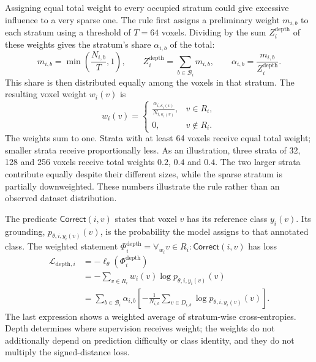 \documentclass[12pt,a4paper]{article}
\begin{document}
Assigning equal total weight to every occupied stratum could give
excessive influence to a very sparse one. The rule first assigns a
preliminary weight $m_{i,b}$ to each stratum using a threshold of $T=64$
voxels. Dividing by the sum $Z_i^{\mathrm{depth}}$ of these weights gives
the stratum's share $\alpha_{i,b}$ of the total:
\begin{equation}
 m_{i,b}=\min\left(\frac{N_{i,b}}{T},1\right),
\qquad
 Z_i^{\mathrm{depth}}=\sum_{b\in\mathcal{B}_i}m_{i,b},
\qquad
 \alpha_{i,b}=\frac{m_{i,b}}{Z_i^{\mathrm{depth}}}.
\label{eq:depth-stratum-masses}
\end{equation}
This share is then distributed equally among the voxels in that stratum.
The resulting voxel weight $w_i(v)$ is
\begin{equation}
 w_i(v)=
 \begin{cases}
 \displaystyle\frac{\alpha_{i,\kappa_i(v)}}{N_{i,\kappa_i(v)}},
       &v\in R_i,\\[0.6em]
 0,    &v\notin R_i.
 \end{cases}
\label{eq:depth-voxel-weights}
\end{equation}
The weights sum to one. Strata with at least 64 voxels receive equal
total weight; smaller strata receive proportionally less. As an
illustration, three strata of 32, 128 and 256 voxels receive total
weights $0.2$, $0.4$ and $0.4$. The two larger strata contribute
equally despite their different sizes, while the sparse stratum is
partially downweighted. These numbers illustrate the rule rather
than an observed dataset distribution.

The predicate $\mathsf{Correct}(i,v)$ states that voxel $v$ has its
reference class $y_i(v)$. Its grounding, $p_{\theta,i,y_i(v)}(v)$, is
the probability the model assigns to that annotated class. The weighted statement
$\Phi_i^{\mathrm{depth}}=\forall_{w_i}v\in R_i:
\mathsf{Correct}(i,v)$ has loss
\begin{equation}
\begin{aligned}
\mathcal{L}_{\mathrm{depth},i}
 &=-\ell_\theta(\Phi_i^{\mathrm{depth}})\\
 &=-\sum_{v\in R_i}w_i(v)\log p_{\theta,i,y_i(v)}(v)\\
 &=\sum_{b\in\mathcal{B}_i}\alpha_{i,b}
   \left[-\frac{1}{N_{i,b}}\sum_{v\in D_{i,b}}
                    \log p_{\theta,i,y_i(v)}(v)\right].
\end{aligned}
\label{eq:depth-weighted-class-loss}
\end{equation}
The last expression shows a weighted average of stratum-wise
cross-entropies. Depth determines where supervision receives weight;
the weights do not additionally depend on prediction difficulty or class
identity, and they do not multiply the signed-distance loss.
\end{document}

